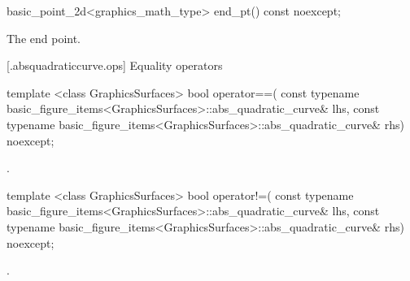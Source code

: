 %
\begin{itemdecl}
basic_point_2d<graphics_math_type> end_pt() const noexcept;
\end{itemdecl}
\begin{itemdescr}
\pnum
\returns The end point.
\end{itemdescr}

 [\iotwod.absquadraticcurve.ops] {Equality operators}%

%
\begin{itemdecl}
template <class GraphicsSurfaces>
bool operator==(
  const typename basic_figure_items<GraphicsSurfaces>::abs_quadratic_curve& lhs,
  const typename basic_figure_items<GraphicsSurfaces>::abs_quadratic_curve& rhs) 
  noexcept;
\end{itemdecl}
\begin{itemdescr}
\pnum
\returns
{}.
\end{itemdescr}

%
\begin{itemdecl}
template <class GraphicsSurfaces>
bool operator!=(
  const typename basic_figure_items<GraphicsSurfaces>::abs_quadratic_curve& lhs,
  const typename basic_figure_items<GraphicsSurfaces>::abs_quadratic_curve& rhs) 
  noexcept;
\end{itemdecl}
\begin{itemdescr}
\pnum
\returns
{}.
\end{itemdescr}
